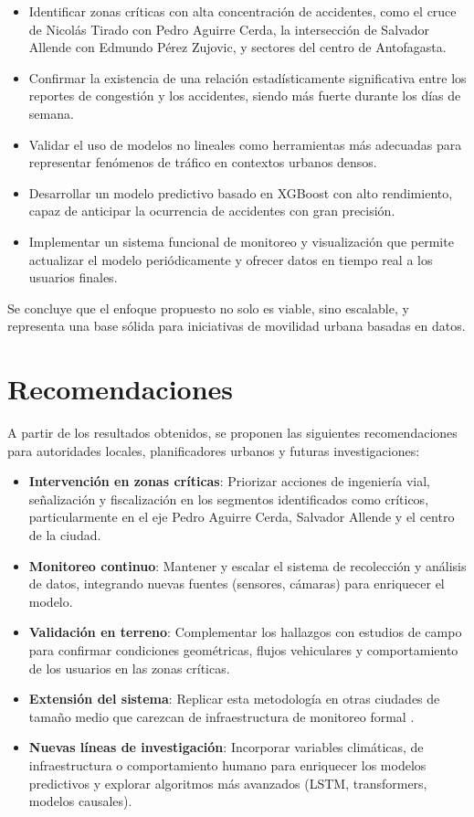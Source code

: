 \documentclass[12pt]{article}
\begin{document}
{\begin{itemize}
    \item Identificar zonas críticas con alta concentración de accidentes, como el cruce de Nicolás Tirado con Pedro Aguirre Cerda, la intersección de Salvador Allende con Edmundo Pérez Zujovic, y sectores del centro de Antofagasta.
    \item Confirmar la existencia de una relación estadísticamente significativa entre los reportes de congestión y los accidentes, siendo más fuerte durante los días de semana.
    \item Validar el uso de modelos no lineales como herramientas más adecuadas para representar fenómenos de tráfico en contextos urbanos densos.
    \item Desarrollar un modelo predictivo basado en XGBoost con alto rendimiento, capaz de anticipar la ocurrencia de accidentes con gran precisión.
    \item Implementar un sistema funcional de monitoreo y visualización que permite actualizar el modelo periódicamente y ofrecer datos en tiempo real a los usuarios finales.
\end{itemize}

Se concluye que el enfoque propuesto no solo es viable, sino escalable, y representa una base sólida para iniciativas de movilidad urbana basadas en datos.

\section{Recomendaciones}

A partir de los resultados obtenidos, se proponen las siguientes recomendaciones para autoridades locales, planificadores urbanos y futuras investigaciones:

\begin{itemize}
    \item \textbf{Intervención en zonas críticas}: Priorizar acciones de ingeniería vial, señalización y fiscalización en los segmentos identificados como críticos, particularmente en el eje Pedro Aguirre Cerda, Salvador Allende y el centro de la ciudad.
    \item \textbf{Monitoreo continuo}: Mantener y escalar el sistema de recolección y análisis de datos, integrando nuevas fuentes (sensores, cámaras) para enriquecer el modelo.
    \item \textbf{Validación en terreno}: Complementar los hallazgos con estudios de campo para confirmar condiciones geométricas, flujos vehiculares y comportamiento de los usuarios en las zonas críticas.
    \item \textbf{Extensión del sistema}: Replicar esta metodología en otras ciudades de tamaño medio que carezcan de infraestructura de monitoreo formal \citep{berhanu2024}.
    \item \textbf{Nuevas líneas de investigación}: Incorporar variables climáticas, de infraestructura o comportamiento humano para enriquecer los modelos predictivos y explorar algoritmos más avanzados (LSTM, transformers, modelos causales).
\end{itemize}

}
\end{document}
